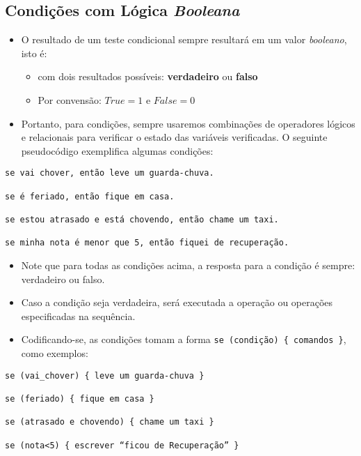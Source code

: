 \documentclass[12pt,a4paper]{article}
\providecommand{\tightlist}{%
      \setlength{\itemsep}{0pt}\setlength{\parskip}{0pt}}
\begin{document}
    \hypertarget{condiuxe7uxf5es-com-luxf3gica-booleana}{%
\subsection{\texorpdfstring{Condições com Lógica
\emph{Booleana}}{Condições com Lógica Booleana}}\label{condiuxe7uxf5es-com-luxf3gica-booleana}}

    \begin{itemize}
\tightlist
\item
  O resultado de um teste condicional sempre resultará em um valor
  \emph{booleano}, isto é:

  \begin{itemize}
  \tightlist
  \item
    com dois resultados possíveis: \textbf{verdadeiro} ou \textbf{falso}
  \item
    Por convensão: \(True=1\) e \(False=0\)
  \end{itemize}
\item
  Portanto, para condições, sempre usaremos combinações de operadores
  lógicos e relacionais para verificar o estado das variáveis
  verificadas. O seguinte pseudocódigo exemplifica algumas condições:
\end{itemize}

    \begin{verbatim}
se vai chover, então leve um guarda-chuva.

se é feriado, então fique em casa.

se estou atrasado e está chovendo, então chame um taxi.

se minha nota é menor que 5, então fiquei de recuperação.
\end{verbatim}

    \begin{itemize}
\item
  Note que para todas as condições acima, a resposta para a condição é
  sempre: verdadeiro ou falso.
\item
  Caso a condição seja verdadeira, será executada a operação ou
  operações especificadas na sequência.
\item
  Codificando-se, as condições tomam a forma
  \texttt{se\ (condição)\ \{\ comandos\ \}}, como exemplos:
\end{itemize}

    \begin{verbatim}
se (vai_chover) { leve um guarda-chuva }

se (feriado) { fique em casa }

se (atrasado e chovendo) { chame um taxi }

se (nota<5) { escrever “ficou de Recuperação” }
\end{verbatim}
\end{document}
